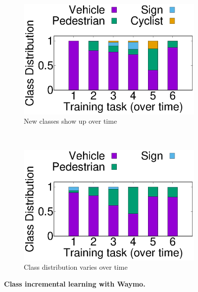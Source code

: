 \begin{figure}[t]
  \begin{subfigure}[t]{0.5\linewidth}
    \centering
    \includegraphics[width=\linewidth]{figures/motivation/Class_Incrementality/new_class.eps}
    \caption{\small New classes show up over time}
  \end{subfigure}
  ~~
  \begin{subfigure}[t]{0.5\linewidth}
    \centering
    \includegraphics[width=\linewidth]{figures/motivation/Class_Incrementality/class_dist_change.eps} 
    \caption{\small Class distribution varies over time}
    \label{fig:class-distrib-motivation}
  \end{subfigure}
  
  \caption{\bf\small Class incremental learning with Waymo.   }
  \label{fig:waymo-motivation}
\end{figure}


